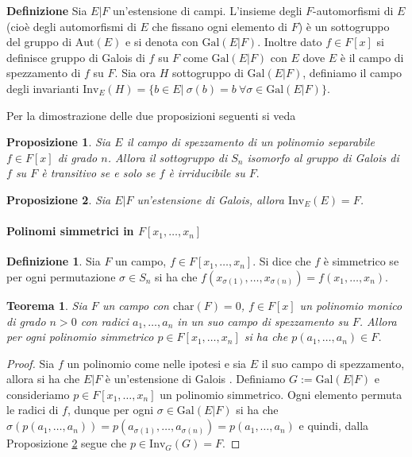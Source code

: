 \documentclass[10pt,oneside]{article}
\theoremstyle{definition}
\theoremstyle{plain}
\newtheorem{teo}{Teorema}
\theoremstyle{definition}
\newtheorem{dfn}{Definizione}
\theoremstyle{plain}
\newtheorem{prop}{Proposizione}
\theoremstyle{plain}
\newcommand{\car}{\mathrm{char}}
\newcommand{\Aut}{\mathrm{Aut}}
\newcommand{\Gal}{\mathrm{Gal}}
\begin{document}
\textbf{Definizione} Sia $E|F$  un'estensione di campi. L'insieme degli $F$-automorfismi di $E$ (cioè degli automorfismi di $E$ che fissano ogni elemento di $F$) è un sottogruppo del gruppo di $\Aut(E)$ e si denota con $\Gal(E|F)$. Inoltre dato $f \in F[x]$ si definisce gruppo di Galois di $f$ su $F$ come $\Gal(E|F)$ con $E$ dove $E$ è il campo di spezzamento di $f$ su $F$. Sia ora $H$ sottogruppo di $\Gal(E|F)$, definiamo il campo degli invarianti $\mathrm{Inv}_E(H)= \{b \in E |\  \sigma(b)=b\  \forall  \sigma \in \Gal(E|F) \}$.

Per la dimostrazione delle due proposizioni seguenti si veda \cite{Cas}
\begin{prop}\label{prop:gal}
Sia $E$ il campo di spezzamento di un polinomio separabile $f \in F[x]$ di grado $n$. Allora il sottogruppo di $S_n$ isomorfo al gruppo di Galois di $f$ su $F$ è transitivo se e solo se $f$ è irriducibile su $F.$
\end{prop}
\begin{prop}\label{prop: invarianti di gal} Sia $E|F$ un'estensione di Galois, allora $\mathrm{Inv}_E(E)=F$.
\end{prop}
\paragraph{Polinomi simmetrici in $F[x_1,\dots, x_n]$}
\begin{dfn}
Sia $F$ un campo, $f \in F[x_1,\dots,x_n]$. Si dice che $f$ è simmetrico se per ogni permutazione $\sigma \in S_n$ si ha che $f(x_{\sigma(1)},\dots, x_{\sigma(n)})=f(x_1,\dots,x_n)$.
\end{dfn}
\begin{teo}\label{teo:polsim}
Sia $F$ un campo con $\car(F)=0$, $f \in F[x]$ un polinomio monico di grado $n>0$ con radici $a_1,\dots, a_n$ in un suo campo di spezzamento su $F$. Allora per ogni polinomio simmetrico $p \in F[x_1,\dots, x_n]$ si ha che $p(a_1,\dots, a_n)\in F$.
\end{teo}
\begin{proof}
Sia $f$ un polinomio come nelle ipotesi e sia $E$ il suo campo di spezzamento, allora si ha che $E|F$ è un'estensione di Galois . Definiamo $G:= \Gal(E|F)$ e consideriamo $p \in F[x_1,\dots, x_n]$ un polinomio simmetrico. Ogni elemento permuta le radici di $f$, dunque per ogni $\sigma \in \Gal(E|F)$ si ha che  $\sigma (p(a_1,\dots, a_n))= p( a_{\sigma(1)},\dots, a_{\sigma(n)})=p(a_1,\dots, a_n)$ e quindi, dalla Proposizione \ref{prop: invarianti di gal} segue che  $p \in \mathrm{Inv}_G(G)=F$.
\end{proof}
\end{document}
